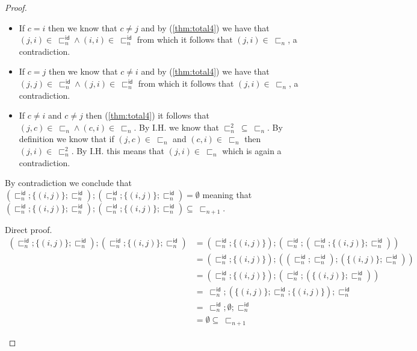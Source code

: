 \begin{lem}
{\begin{proof}
\begin{enumerate}[label=\alph*)]
			\begin{itemize}
				\item If $c = i$ then we know that $c \neq j$ and by (\ref{thm:total4}) we have that $(j, i) \in\ \sqsubset_n^\mathsf{id} \land (i, i) \in\ \sqsubset_n^\mathsf{id}$ from which it follows that $(j, i) \in\ \sqsubset_n$, a contradiction.
				\item If $c = j$ then we know that $c \neq i$ and by (\ref{thm:total4}) we have that $(j, j) \in\ \sqsubset_n^\mathsf{id} \land (j, i) \in\ \sqsubset_n^\mathsf{id}$ from which it follows that $(j, i) \in\ \sqsubset_n$, a contradiction.
				\item If $c \neq i$ and $c \neq j$ then (\ref{thm:total4}) it follows that $(j, c) \in\ \sqsubset_n \land (c, i) \in\ \sqsubset_n$. By I.H. we know that $\sqsubset_n^2\ \subseteq\ \sqsubset_n$. By definition we know that if $(j, c) \in\ \sqsubset_n$ and $(c, i) \in\ \sqsubset_n$ then $(j, i) \in\ \sqsubset_n^2$. By I.H. this means that $(j, i) \in\ \sqsubset_n$ which is again a contradiction.
			\end{itemize}
			By contradiction we conclude that $\left( \sqsubset_n^\mathsf{id} ; \{ (i, j) \} ; \sqsubset_n^\mathsf{id} \right) ; \left( \sqsubset_n^\mathsf{id} ; \{ (i, j) \} ; \sqsubset_n^\mathsf{id} \right) = \emptyset$ meaning that $\left( \sqsubset_n^\mathsf{id} ; \{ (i, j) \} ; \sqsubset_n^\mathsf{id} \right) ; \left( \sqsubset_n^\mathsf{id} ; \{ (i, j) \} ; \sqsubset_n^\mathsf{id} \right) \subseteq\ \sqsubset_{n + 1}$.
			
			Direct proof.
			\fi
			\begin{align*}
				\left( \sqsubset_n^\mathsf{id} ; \{ (i, j) \} ; \sqsubset_n^\mathsf{id} \right) ; \left( \sqsubset_n^\mathsf{id} ; \{ (i, j) \} ; \sqsubset_n^\mathsf{id} \right)
					&=
				\left( \sqsubset_n^\mathsf{id} ; \{ (i, j) \} \right) ; \left( \sqsubset_n^\mathsf{id} ; \left( \sqsubset_n^\mathsf{id} ; \{ (i, j) \} ; \sqsubset_n^\mathsf{id} \right) \right) \\
					&=
				\left( \sqsubset_n^\mathsf{id} ; \{ (i, j) \} \right) ; \left( \left( \sqsubset_n^\mathsf{id} ;  \sqsubset_n^\mathsf{id} \right) ; \left( \{ (i, j) \} ; \sqsubset_n^\mathsf{id} \right) \right) \\
					&=
				\left( \sqsubset_n^\mathsf{id} ; \{ (i, j) \} \right) ; \left( \sqsubset_n^\mathsf{id} ; \left( \{ (i, j) \} ; \sqsubset_n^\mathsf{id} \right) \right) \\
					&=\
				\sqsubset_n^\mathsf{id} ; \left( \{ (i, j) \} ; \sqsubset_n^\mathsf{id} ; \{ (i, j) \} \right) ; \sqsubset_n^\mathsf{id} \\
					&=\
				\sqsubset_n^\mathsf{id} ; \emptyset ; \sqsubset_n^\mathsf{id} \\
					&= \emptyset \subseteq\ \sqsubset_{n+1}
			\end{align*}
	\end{enumerate}
	\end{proof}
	}
\end{lem}